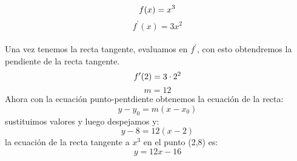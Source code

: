 \documentclass{article}
\begin{document}
\begin{equation*}
    f(x)=x^3\\
\end{equation*}
\begin{equation*}
    f^\prime(x)=3x^2
\end{equation*}\\
Una vez tenemos la recta tangente, evaluamos en $f^\prime$, con esto obtendremos la pendiente de la recta tangente.
\begin{equation*}
    f^\prime(2)=3\cdot2^2\\
\end{equation*}
\begin{equation*}
    m=12
\end{equation*}
Ahora con la ecuación punto-pentdiente obtenemos la ecuación de la recta:
\begin{equation*}
    y-y_0=m(x-x_0)
\end{equation*}
sustituimos valores y luego despejamos y:
\begin{equation*}
    y-8=12(x-2)
\end{equation*}
la ecuación de la recta tangente a $x^3$ en el punto (2,8) es:
\begin{equation*}
    y=12x-16
\end{equation*}
\end{document}
